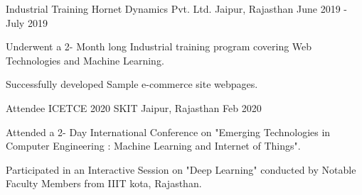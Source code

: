 


\begin{cventries}


\cventry
{Industrial Training} %
{Hornet Dynamics Pvt. Ltd.} %
{Jaipur, Rajasthan} %
{June 2019 - July 2019} %
{ %
\begin{cvitems}
\item {Underwent a 2- Month long Industrial training program covering Web Technologies and Machine Learning.}
\item {Successfully developed Sample e-commerce site webpages.}
\end{cvitems}
}

\cventry
{Attendee} %
{ICETCE 2020} %
{SKIT Jaipur, Rajasthan} %
{Feb 2020} %
{ %
\begin{cvitems}
\item {Attended a 2- Day International Conference on "Emerging Technologies in Computer Engineering : Machine Learning and Internet of Things".}
\item {Participated in an Interactive Session on "Deep Learning" conducted by Notable Faculty Members from IIIT kota, Rajasthan.}
\end{cvitems}
}



\end{cventries}